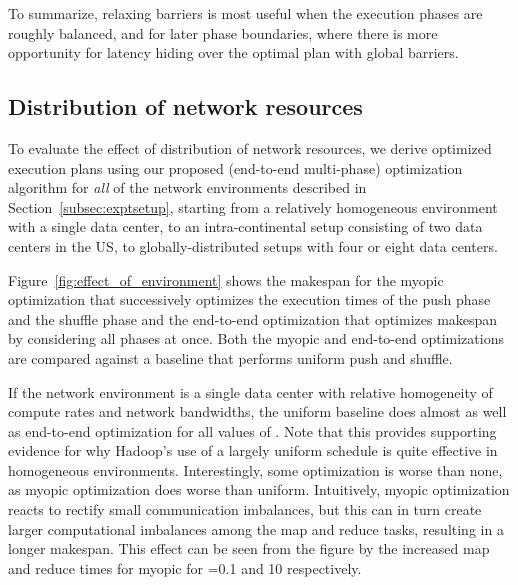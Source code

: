 To summarize, relaxing barriers is most useful when the execution phases are
roughly balanced, and for later phase boundaries, where there is more
opportunity for latency hiding over the optimal plan with global barriers.

\subsection{Distribution of network resources}
\label{subsec:network}
To evaluate the effect of distribution of network resources, we derive
optimized execution plans using our proposed (end-to-end multi-phase)
optimization algorithm for {\em all} of the network environments described in
Section~\ref{subsec:exptsetup}, starting from a relatively homogeneous
environment with a single data center, to an intra-continental setup consisting
of two data centers in the US, to globally-distributed setups with four or
eight data centers.
\begin{figure*}[htbp]
  \centering
  \caption{A comparison of myopic and end-to-end optimization relative to the
  uniform baseline for different network environments and different values of
  .
  The makespans are normalized by computing the ratio of the actual makespan to
  the makespan of the corresponding uniform schedule.
  A global barrier is used between phases in all cases.}
  \label{fig:effect_of_environment}
\end{figure*}

Figure~\ref{fig:effect_of_environment} shows the makespan for the myopic
optimization that successively optimizes the execution times of the push phase
and the shuffle phase and the end-to-end optimization that optimizes makespan
by considering all phases at once.
Both the myopic and end-to-end optimizations are compared against a baseline
that performs uniform push and shuffle.

If the network environment is a single data center with relative homogeneity of
compute rates and network bandwidths, the uniform baseline does almost as well
as end-to-end optimization for all values of .
Note that this provides supporting evidence for why Hadoop's use of a largely
uniform schedule is quite effective in homogeneous environments.
Interestingly, some optimization is worse than none, as myopic optimization
does worse than uniform.
Intuitively, myopic optimization reacts to rectify small communication
imbalances, but this can in turn create larger computational imbalances among
the map and reduce tasks, resulting in a longer makespan.
This effect can be seen from the figure by the increased map and reduce times
for myopic for =0.1 and 10 respectively.

